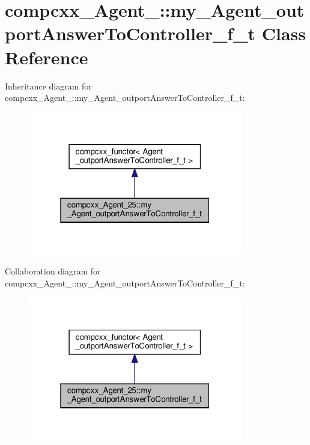 \hypertarget{classcompcxx__Agent__25_1_1my__Agent__outportAnswerToController__f__t}{}\section{compcxx\+\_\+\+Agent\+\_\+:\+:my\+\_\+\+Agent\+\_\+outport\+Answer\+To\+Controller\+\_\+f\+\_\+t Class Reference}
\label{classcompcxx__Agent__25_1_1my__Agent__outportAnswerToController__f__t}


Inheritance diagram for compcxx\+\_\+\+Agent\+\_\+:\+:my\+\_\+\+Agent\+\_\+outport\+Answer\+To\+Controller\+\_\+f\+\_\+t\+:\nopagebreak
\begin{figure}[H]
\begin{center}
\leavevmode
\includegraphics[width=265pt]{classcompcxx__Agent__25_1_1my__Agent__outportAnswerToController__f__t__inherit__graph}
\end{center}
\end{figure}


Collaboration diagram for compcxx\+\_\+\+Agent\+\_\+:\+:my\+\_\+\+Agent\+\_\+outport\+Answer\+To\+Controller\+\_\+f\+\_\+t\+:\nopagebreak
\begin{figure}[H]
\begin{center}
\leavevmode
\includegraphics[width=265pt]{classcompcxx__Agent__25_1_1my__Agent__outportAnswerToController__f__t__coll__graph}
\end{center}
\end{figure}

